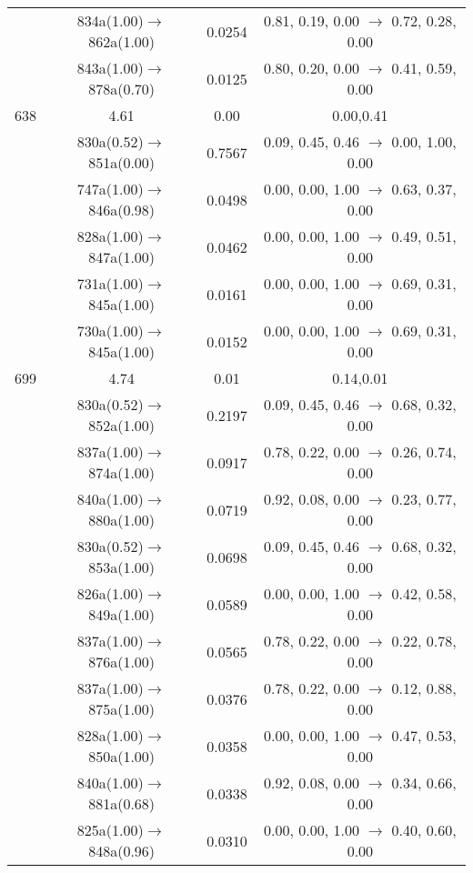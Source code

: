 \documentclass[10pt,a4paper]{article}
\begin{document}
\begin{longtable}{c|c|c|c}
 	& 834a(1.00)$\rightarrow$862a(1.00) &	 0.0254 &	 0.81, 0.19, 0.00 $\rightarrow$ 0.72, 0.28, 0.00 \\ 
 	& 843a(1.00)$\rightarrow$878a(0.70) &	 0.0125 &	 0.80, 0.20, 0.00 $\rightarrow$ 0.41, 0.59, 0.00 \\ 
 \hline638 &	 4.61 &	 0.00 &	 0.00,0.41 \\ 
  	& 830a(0.52)$\rightarrow$851a(0.00) &	 0.7567 &	 0.09, 0.45, 0.46 $\rightarrow$ 0.00, 1.00, 0.00 \\ 
 	& 747a(1.00)$\rightarrow$846a(0.98) &	 0.0498 &	 0.00, 0.00, 1.00 $\rightarrow$ 0.63, 0.37, 0.00 \\ 
 	& 828a(1.00)$\rightarrow$847a(1.00) &	 0.0462 &	 0.00, 0.00, 1.00 $\rightarrow$ 0.49, 0.51, 0.00 \\ 
 	& 731a(1.00)$\rightarrow$845a(1.00) &	 0.0161 &	 0.00, 0.00, 1.00 $\rightarrow$ 0.69, 0.31, 0.00 \\ 
 	& 730a(1.00)$\rightarrow$845a(1.00) &	 0.0152 &	 0.00, 0.00, 1.00 $\rightarrow$ 0.69, 0.31, 0.00 \\ 
 \hline699 &	 4.74 &	 0.01 &	 0.14,0.01 \\ 
  	& 830a(0.52)$\rightarrow$852a(1.00) &	 0.2197 &	 0.09, 0.45, 0.46 $\rightarrow$ 0.68, 0.32, 0.00 \\ 
 	& 837a(1.00)$\rightarrow$874a(1.00) &	 0.0917 &	 0.78, 0.22, 0.00 $\rightarrow$ 0.26, 0.74, 0.00 \\ 
 	& 840a(1.00)$\rightarrow$880a(1.00) &	 0.0719 &	 0.92, 0.08, 0.00 $\rightarrow$ 0.23, 0.77, 0.00 \\ 
 	& 830a(0.52)$\rightarrow$853a(1.00) &	 0.0698 &	 0.09, 0.45, 0.46 $\rightarrow$ 0.68, 0.32, 0.00 \\ 
 	& 826a(1.00)$\rightarrow$849a(1.00) &	 0.0589 &	 0.00, 0.00, 1.00 $\rightarrow$ 0.42, 0.58, 0.00 \\ 
 	& 837a(1.00)$\rightarrow$876a(1.00) &	 0.0565 &	 0.78, 0.22, 0.00 $\rightarrow$ 0.22, 0.78, 0.00 \\ 
 	& 837a(1.00)$\rightarrow$875a(1.00) &	 0.0376 &	 0.78, 0.22, 0.00 $\rightarrow$ 0.12, 0.88, 0.00 \\ 
 	& 828a(1.00)$\rightarrow$850a(1.00) &	 0.0358 &	 0.00, 0.00, 1.00 $\rightarrow$ 0.47, 0.53, 0.00 \\ 
 	& 840a(1.00)$\rightarrow$881a(0.68) &	 0.0338 &	 0.92, 0.08, 0.00 $\rightarrow$ 0.34, 0.66, 0.00 \\ 
 	& 825a(1.00)$\rightarrow$848a(0.96) &	 0.0310 &	 0.00, 0.00, 1.00 $\rightarrow$ 0.40, 0.60, 0.00 \\ 

\end{longtable}
\end{document}

